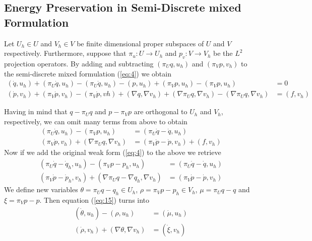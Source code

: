 \documentclass[12pt]{article}
\begin{document}
\subsection{Energy Preservation in Semi-Discrete mixed Formulation}
Let $U_h\in U$ and $V_h\in V$ be finite dimensional proper subspaces of $U$ and $V$ respectively. Furthermore, suppose that $\pi_u:U\to U_h$ and $p_v:V\to V_h$ be the $L^2$ projection operators. By adding and subtracting $(\pi_Uq,u_h)$ and $(\pi_Vp,v_h)$ to the semi-discrete mixed formulation (\ref{eq:4}) we obtain
\begin{equation} \label{eq:13}
\begin{aligned}
	(\dot q,u_h) + (\pi_U\dot q,u_h) - (\pi_U \dot q, u_h) - (p,u_h) + (\pi_V p , u_h) - (\pi_V p , u_h) &= 0 \\
	(\dot p,v_h) + (\pi_V \dot p , v_h) - (\pi_V \dot p , vh) + (\nabla q , \nabla v_h) + (\nabla \pi_U q , \nabla v_h ) - (\nabla \pi_U q , \nabla v_h ) &= (f,v_h)
\end{aligned}
\end{equation}

Having in mind that $q - \pi_U q$ and $p - \pi_V p$ are orthogonal to $U_h$ and $V_h$, respectively, we can omit many terms from above to obtain
\begin{equation} \label{eq:14}
\begin{aligned}
	(\pi_U\dot q,u_h) - (\pi_V p , u_h) &= (\pi_U \dot q - \dot q , u_h) \\
	(\pi_V \dot p, v_h) + (\nabla \pi_U q, \nabla v_h) &= (\pi_V \dot p - \dot p, v_h) + (f,v_h)
\end{aligned}
\end{equation}
Now if we add the original weak form (\ref{eq:4}) to the above we retrieve
\begin{equation} \label{eq:15}
\begin{aligned}
	(\pi_U \dot q - \dot q_h , u_h) - (\pi_V p - p_h, u_h ) &= (\pi_U \dot q - \dot q , u_h) \\
	(\pi_V \dot p - \dot p_h, v_h) + (\nabla \pi_U q - \nabla q_h , \nabla v_h) &= (\pi_V \dot p - \dot p, v_h)
\end{aligned}
\end{equation}
We define new variables $\theta = \pi_U q - q_h \in U_h$, $\rho = \pi_V p - p_h\in V_h$, $\mu = \pi_U q - q$ and  $\xi = \pi_V p  - p$. Then equation (\ref{eq:15}) turns into
\begin{equation} \label{eq:16}
\begin{aligned}
	(\dot \theta , u_h) - (\rho, u_h ) &= (\dot \mu , u_h) \\
	(\dot \rho,v_h) + (\nabla \theta , \nabla v_h) &= (\dot \xi, v_h)
\end{aligned}
\end{equation}
\end{document}
